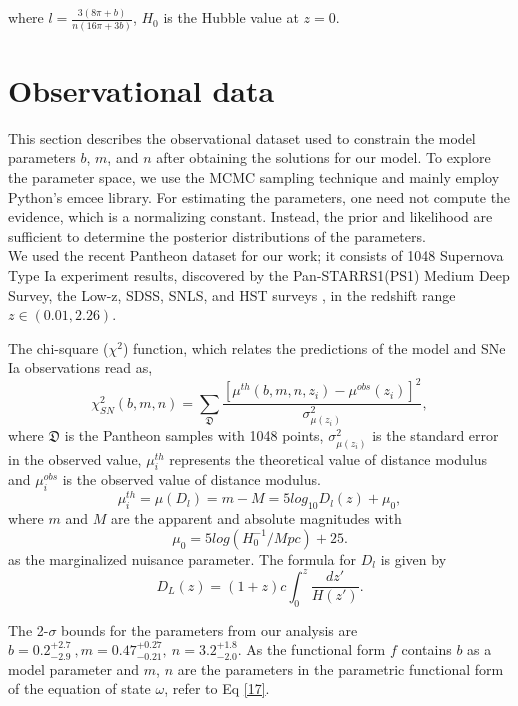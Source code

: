 where $l= \frac{3(8\pi+b)}{n(16 \pi+3 b)}$, $H_{0}$ is the Hubble value at $z=0$.

\section{Observational data}\label{sec4}

This section describes the observational dataset used to constrain the model parameters $b$, $m$, and $n$ after obtaining the solutions for our model. To explore the parameter space, we use the MCMC sampling technique and mainly employ Python's emcee \cite{Mackey} library. For estimating the parameters, one need not compute the evidence, which is a normalizing constant. Instead, the prior and likelihood are sufficient to determine the posterior distributions of the parameters.\\
We used the recent Pantheon dataset for our work; it consists of 1048 Supernova Type Ia experiment results, discovered by the Pan-STARRS1(PS1) Medium Deep Survey, the Low-z, SDSS, SNLS, and HST surveys \cite{Scolnic,Chang}, in the redshift range $z \in (0.01, 2.26)$.

The chi-square ($\chi^{2}$) function, which relates the predictions of the model and SNe Ia observations read as,
\begin{equation} \label{23}
 \chi^{2}_{SN}(b,m,n )= \sum_{\mathfrak{D}} \frac{[\mu^{th}(b, m, n , z_{i})-\mu^{obs}(z_{i})]^{2}}{\sigma^{2}_{\mu(z_{i})}},
\end{equation}
where $\mathfrak{D}$ is the Pantheon samples with 1048 points, $\sigma^{2}_{\mu(z_{i})}$ is the standard error in the observed value, $\mu_{i}^{th}$ represents the theoretical value of distance modulus and $\mu_{i}^{obs}$ is the observed value of distance modulus.
\begin{equation} \label{24}
\mu_{i}^{th}= \mu(D_{l})= m -M = 5 log_{10}D_{l}(z)+ \mu_{0},
\end{equation}
where $m$ and $M$ are the apparent and absolute magnitudes with
\begin{equation}
\mu_{0}= 5 log(H_{0}^{-1}/Mpc)+25.
\end{equation}
as the marginalized nuisance parameter.
The formula for $D_{l}$ is given by
 \begin{equation} \label{25}
D_{L}(z)= (1+z) c \int_{0}^{z} \frac{dz'}{H(z')}.
\end{equation}

The 2-$\sigma$ bounds for the parameters from our analysis are $b = 0.2^{+2.7}_{-2.9} \ , m = 0.47^{+0.27}_{-0.21},\ n = 3.2^{+1.8}_{-2.0}$. As the functional form $f$ contains $b$ as a model parameter and $m$, $n$ are the parameters in the parametric functional form of the equation of state $\omega$, refer to Eq \eqref{17}.

